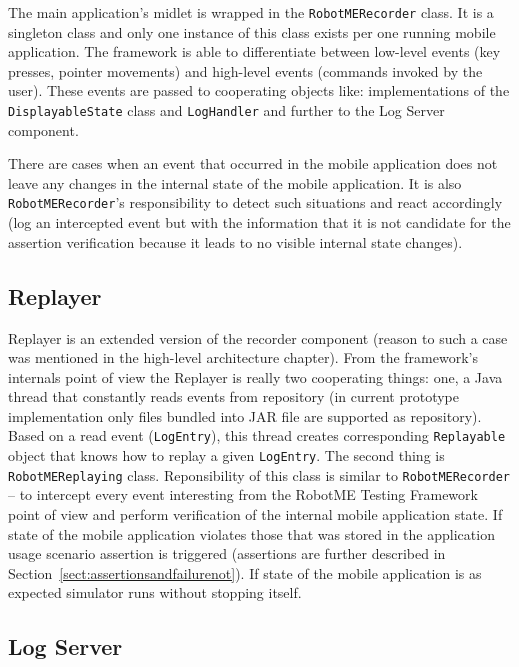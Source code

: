 The main application's midlet is wrapped in the \texttt{RobotMERecorder} class. 
It is a singleton class and only one instance
of this class exists per one running mobile application. The framework is able to differentiate
between low-level events (key presses, pointer movements) and high-level events (commands invoked 
by the user). These events are passed to cooperating objects like: implementations of the \texttt{DisplayableState}
class and \texttt{LogHandler} and further to the Log Server component. 

There are cases when an event that occurred in the mobile application does not leave any changes
in the internal state of the mobile application. It is also \texttt{RobotMERecorder}'s responsibility
to detect such situations and react accordingly (log an intercepted event but with the
information that it is not candidate for the assertion verification because it leads
to no visible internal state changes).

\subsection{Replayer}

Replayer is an extended version of the recorder component (reason to such a case was mentioned in
the high-level architecture chapter). From the framework's internals point of view the Replayer is
really two cooperating things: one, a Java thread that constantly reads events from
repository (in current prototype implementation only files bundled into JAR file
are supported as repository). Based on a read event (\texttt{LogEntry}), this thread creates corresponding
\texttt{Replayable} object that knows how to replay a given \texttt{LogEntry}. The second
thing is \texttt{RobotMEReplaying} class. Reponsibility of this class is similar to
\texttt{RobotMERecorder} -- to intercept every event interesting from the RobotME Testing Framework
point of view and perform verification of the internal mobile application state.
If state of the mobile application violates those that was stored in the
application usage scenario assertion is triggered (assertions are further described
in Section~\ref{sect:assertionsandfailurenot}). If state of the mobile
application is as expected simulator runs without stopping itself.

\subsection{Log Server}

